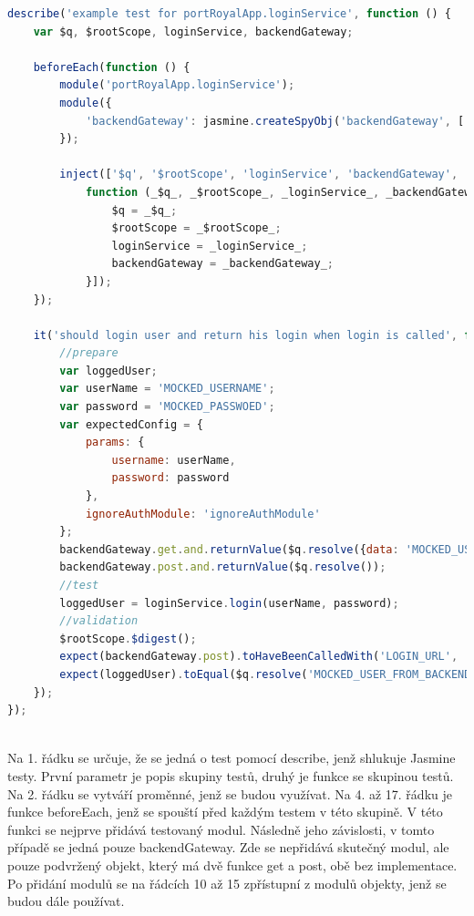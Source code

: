 \documentclass[czech,master,public,dept460,male,cpdeclaration,twoside]{diploma}
\begin{document}
\begin{lstlisting}[language=JavaScript, caption=Ukázka testu pomocí Jasmine]
describe('example test for portRoyalApp.loginService', function () {
    var $q, $rootScope, loginService, backendGateway;

    beforeEach(function () {
        module('portRoyalApp.loginService');
        module({
            'backendGateway': jasmine.createSpyObj('backendGateway', ['get', 'post'])
        });

        inject(['$q', '$rootScope', 'loginService', 'backendGateway',
            function (_$q_, _$rootScope_, _loginService_, _backendGateway_) {
                $q = _$q_;
                $rootScope = _$rootScope_;
                loginService = _loginService_;
                backendGateway = _backendGateway_;
            }]);
    });

    it('should login user and return his login when login is called', function () {
        //prepare
        var loggedUser;
        var userName = 'MOCKED_USERNAME';
        var password = 'MOCKED_PASSWOED';
        var expectedConfig = {
            params: {
                username: userName,
                password: password
            },
            ignoreAuthModule: 'ignoreAuthModule'
        };
        backendGateway.get.and.returnValue($q.resolve({data: 'MOCKED_USER_FROM_BACKEND'}));
        backendGateway.post.and.returnValue($q.resolve());
        //test
        loggedUser = loginService.login(userName, password);
        //validation
        $rootScope.$digest();
        expect(backendGateway.post).toHaveBeenCalledWith('LOGIN_URL', '', expectedConfig, false, true);
        expect(loggedUser).toEqual($q.resolve('MOCKED_USER_FROM_BACKEND'));
    });
});
\end{lstlisting}
~\\
Na 1. řádku se určuje, že se jedná o test pomocí describe, jenž shlukuje Jasmine testy. První parametr je popis skupiny testů, druhý je funkce se skupinou testů.\\
Na 2. řádku se vytváří proměnné, jenž se budou využívat.
Na 4. až 17. řádku je funkce beforeEach, jenž se spouští před každým testem v této skupině. V této funkci se nejprve přidává testovaný modul. Následně jeho závislosti, v tomto případě se jedná pouze backendGateway. Zde se nepřidává skutečný modul, ale pouze podvržený objekt, který má dvě funkce get a post, obě bez implementace. Po přidání modulů se na řádcích 10 až 15 zpřístupní z modulů objekty, jenž se budou dále používat.\\
\end{document}
